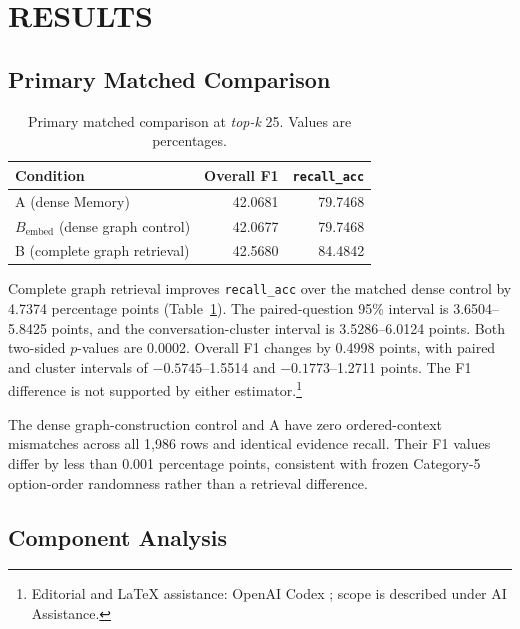 \documentclass[a4paper,twoside]{article}
\newcommand{\recallacc}{\texttt{recall\_acc}}
\newcommand{\bembed}{B_{\mathrm{embed}}}
\newcommand{\topk}{\textit{top-k}}
\newcommand{\aiedit}{\footnote{Editorial and \LaTeX{} assistance: OpenAI Codex
\cite{openai2026codex}; scope is described under AI Assistance.}}
\begin{document}
\section{\uppercase{Results}}

\subsection{Primary Matched Comparison}

\begin{table}[t]
\centering
\caption{Primary matched comparison at \topk{} 25. Values are percentages.}
\label{tab:primary}
\small
\begin{tabular}{@{}lrr@{}}
\toprule
Condition & Overall F1 & \recallacc{} \\
\midrule
A (dense Memory) & 42.0681 & 79.7468 \\
\(\bembed\) (dense graph control) & 42.0677 & 79.7468 \\
B (complete graph retrieval) & 42.5680 & 84.4842 \\
\bottomrule
\end{tabular}
\end{table}

Complete graph retrieval improves \recallacc{} over the matched dense control
by 4.7374 percentage points (Table~\ref{tab:primary}). The paired-question
95\% interval is 3.6504--5.8425 points, and the conversation-cluster interval
is 3.5286--6.0124 points. Both two-sided \(p\)-values are 0.0002. Overall F1
changes by 0.4998 points, with paired and cluster intervals of
\(-0.5745\)--1.5514 and \(-0.1773\)--1.2711 points. The F1 difference is not
supported by either estimator.\aiedit{}

The dense graph-construction control and A have zero ordered-context
mismatches across all 1,986 rows and identical evidence recall. Their F1
values differ by less than 0.001 percentage points, consistent with frozen
Category-5 option-order randomness rather than a retrieval difference.

\subsection{Component Analysis}
\end{document}

